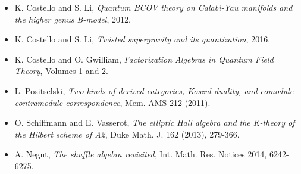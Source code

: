 \documentclass[11pt]{amsart}
\theoremstyle{definition}
\theoremstyle{remark}
\begin{document}
\begin{itemize}[leftmargin=1.2em,itemsep=2pt]
AMS Mathematical Surveys and Monographs 170, 2011.
\item K. Costello and S. Li, \emph{Quantum BCOV theory on Calabi-Yau
manifolds and the higher genus B-model}, 2012.
\item K. Costello and S. Li, \emph{Twisted supergravity and its
quantization}, 2016.
\item K. Costello and O. Gwilliam, \emph{Factorization Algebras in
Quantum Field Theory}, Volumes 1 and 2.
\item L. Positselski, \emph{Two kinds of derived categories, Koszul
duality, and comodule-contramodule correspondence}, Mem. AMS 212
(2011).
\item O. Schiffmann and E. Vasserot, \emph{The elliptic Hall algebra
and the K-theory of the Hilbert scheme of A2}, Duke Math. J. 162
(2013), 279-366.
\item A. Negut, \emph{The shuffle algebra revisited}, Int. Math. Res.
Notices 2014, 6242-6275.
\end{itemize}
\end{document}
